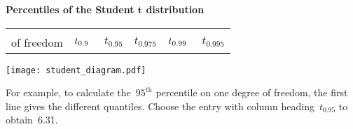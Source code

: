 \documentclass[a4paper]{article}
\begin{document}
\begin{center}
  {\Large\bf Percentiles of the Student $\mathbf{t}$ distribution}
\end{center}


\pagestyle{empty}
\thispagestyle{empty}
\centering
\begin{tabular}{r|ccccc}
  \begin{minipage}{20mm}degrees\\of freedom\end{minipage}
  & \begin{minipage}{1.3cm}\hfill{\Large $t_{0.9\hphantom{9}}$}\hfill\end{minipage}
  & \begin{minipage}{1.3cm}\hfill{\Large $t_{0.95}             $}\hfill\end{minipage}
  & \begin{minipage}{1.3cm}\hfill{\Large $t_{0.975}            $}\hfill\end{minipage}
  & \begin{minipage}{1.3cm}\hfill{\Large $t_{0.99\hphantom{9}} $}\hfill\end{minipage}
  & \begin{minipage}{1.3cm}\hfill{\Large $t_{0.995}            $}\hfill\end{minipage}
  \rule[-4mm]{0mm}{10mm}
  \\  \hline
  \hline
\end{tabular}

\begin{centering}
\texttt{[image: student\_diagram.pdf]}
\end{centering}

\noindent For example, to calculate the~$95^\mathrm{th}$ percentile on
one degree of freedom, the first line gives the different quantiles.
Choose the entry with column heading~$t_{0.95}$ to obtain~6.31.


\end{document}
